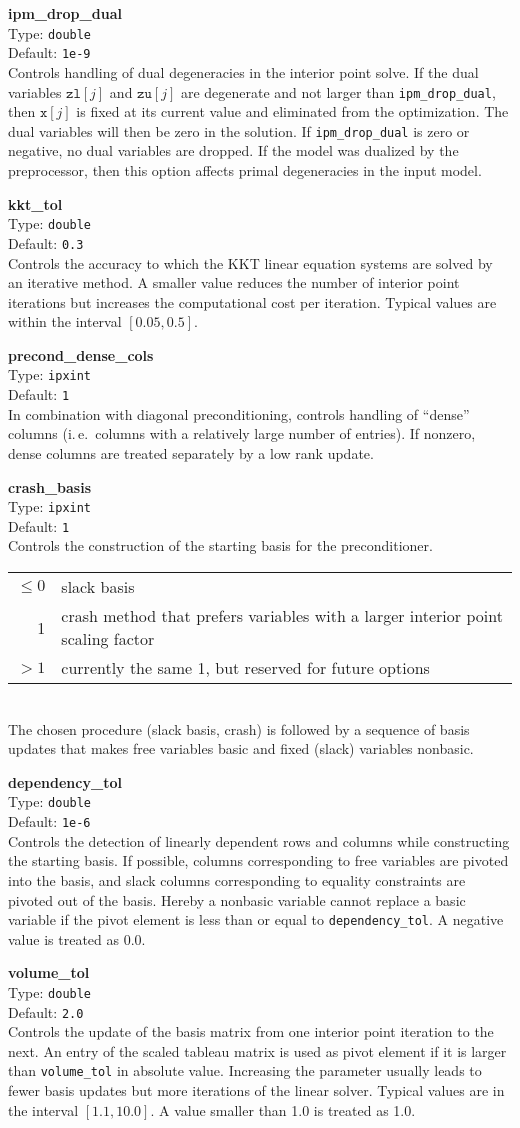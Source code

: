 \documentclass{article}
\newcommand{\ct}{\texttt}
\newcommand{\param}[4]{
  \noindent\begin{minipage}{\textwidth}
    \textbf{#1}\\
    Type: \ct{#2}\\
    Default: \ct{#3}\\
    #4
  \end{minipage}
  \vskip 1\baselineskip
}
\newcommand{\x}{\ct{x}}
\newcommand{\zl}{\ct{zl}}
\newcommand{\zu}{\ct{zu}}
\begin{document}
\param{ipm\_drop\_dual}{double}{1e-9}{
  Controls handling of dual degeneracies in the interior point solve. If the
  dual variables $\zl[j]$ and $\zu[j]$ are degenerate and not larger than
  \ct{ipm\_drop\_dual}, then $\x[j]$ is fixed at its current value and
  eliminated from the optimization. The dual variables will then be zero in the
  solution. If \ct{ipm\_drop\_dual} is zero or negative, no dual variables are
  dropped. If the model was dualized by the preprocessor, then this option
  affects primal degeneracies in the input model.
}

\param{kkt\_tol}{double}{0.3}{
  Controls the accuracy to which the KKT linear equation systems are solved by
  an iterative method. A smaller value reduces the number of interior point
  iterations but increases the computational cost per iteration. Typical values
  are within the interval $[0.05,0.5]$.
}

\param{precond\_dense\_cols}{ipxint}{1}{
  In combination with diagonal preconditioning, controls handling of ``dense''
  columns (i.\,e.\ columns with a relatively large number of entries). If
  nonzero, dense columns are treated separately by a low rank update.
}

\param{crash\_basis}{ipxint}{1}{
  Controls the construction of the starting basis for the preconditioner. \\
  \begin{tabular}{rl}
    $\le0$ & slack basis \\
    1 & crash method that prefers variables with a larger interior point scaling
    factor \\
    $>1$ & currently the same 1, but reserved for future options
  \end{tabular} \\
  The chosen procedure (slack basis, crash) is followed by a sequence of basis
  updates that makes free variables basic and fixed (slack) variables nonbasic.
}

\param{dependency\_tol}{double}{1e-6}{
  Controls the detection of linearly dependent rows and columns while
  constructing the starting basis. If possible, columns corresponding to free
  variables are pivoted into the basis, and slack columns corresponding to
  equality constraints are pivoted out of the basis. Hereby a nonbasic variable
  cannot replace a basic variable if the pivot element is less than or equal to
  \ct{dependency\_tol}. A negative value is treated as 0.0.
}

\param{volume\_tol}{double}{2.0}{
  Controls the update of the basis matrix from one interior point iteration to
  the next. An entry of the scaled tableau matrix is used as pivot element if it
  is larger than \ct{volume\_tol} in absolute value. Increasing the parameter
  usually leads to fewer basis updates but more iterations of the linear solver.
  Typical values are in the interval $[1.1,10.0]$. A value smaller than 1.0 is
  treated as 1.0.
}
\end{document}
